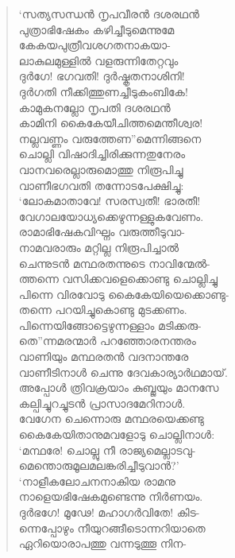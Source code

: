 \begin{verse}
‘സത്യസന്ധന്‍ നൃപവീരന്‍ ദശരഥന്‍\\
പുത്രാഭിഷേകം കഴിച്ചീടുമെന്നുമേ\\
കേകയപുത്രീവശഗതനാകയാ-\\
ലാകുലമുള്ളില്‍ വളരുന്നിതേറ്റവും\\
ദുര്‍ഗേ! ഭഗവതി! ദുര്‍ഷ്കൃതനാശിനി!\\
ദുര്‍ഗതി നീക്കിത്തുണച്ചീടുകംബികേ!\\
കാമുകനല്ലോ നൃപതി ദശരഥന്‍\\
കാമിനി കൈകേയീചിത്തമെന്തീശ്വര!\\
നല്ലവണ്ണം വരുത്തേണ”മെന്നിങ്ങനെ\\
ചൊല്ലി വിഷാദിച്ചിരിക്കുന്നതുനേരം\\
വാനവരെല്ലാരുമൊത്തു നിരൂപിച്ചു\\
വാണീഭഗവതി തന്നോടപേക്ഷിച്ചു:\\
‘ലോകമാതാവേ! സരസ്വതീ! ഭാരതീ!\\
വേഗാലയോധ്യക്കെഴുന്നള്ളുകവേണം.\\
രാമാഭിഷേകവിഘ്നം വരുത്തീടുവാ-\\
നാമവരാരും മറ്റില്ല നിരൂപിച്ചാല്‍\\
ചെന്നുടന്‍ മന്ഥരതന്നുടെ നാവിന്മേല്‍-\\
ത്തന്നെ വസിക്കവളെക്കൊണ്ടു ചൊല്ലിച്ചു\\
പിന്നെ വിരവോടു കൈകേയിയെക്കൊണ്ടു-\\
തന്നെ പറയിച്ചുകൊണ്ടു മുടക്കണം.\\
പിന്നെയിങ്ങോട്ടെഴുന്നള്ളാം മടിക്കരു-\\
തെ”ന്നമരന്മാര്‍ പറഞ്ഞോരനന്തരം\\
വാണിയും മന്ഥരതന്‍ വദനാന്തരേ\\
വാണീടിനാള്‍ ചെന്നു ദേവകാര്യാര്‍ഥമായ്.\\
അപ്പോള്‍ ത്രിവക്രയാം കുബ്ജയും മാനസേ\\
കല്പിച്ചുറച്ചുടന്‍ പ്രാസാദമേറിനാള്‍.\\
വേഗേന ചെന്നൊരു മന്ഥരയെക്കണ്ടു\\
കൈകേയിതാനുമവളോടു ചൊല്ലിനാള്‍:\\
‘മന്ഥരേ! ചൊല്ലു നീ രാജ്യമെല്ലാടവു-\\
മെന്തൊരുമൂലമലങ്കരിച്ചീടുവാന്‍?’\\
‘നാളീകലോചനനാകിയ രാമനു\\
നാളെയഭിഷേകമുണ്ടെന്നു നിര്‍ണയം.\\
ദുര്‍ഭഗേ! മൂഢേ! മഹാഗര്‍വിതേ! കിട-\\
ന്നെപ്പോഴും നീയുറങ്ങീടൊന്നറിയാതെ\\
ഏറിയൊരാപത്തു വന്നടുത്തൂ നിന-\\

\end{verse}
